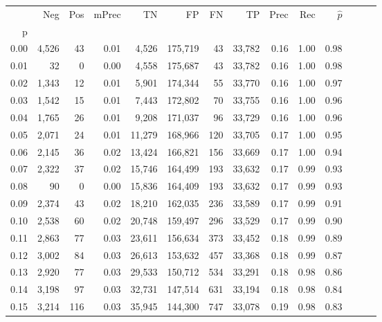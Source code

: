 \begin{tabular}{rrrrrrrrrrrrrr}
\toprule
{} &    Neg &    Pos & mPrec &       TN &       FP &      FN &      TP &  Prec &   Rec & $\hat{p}$ \\
p    &        &        &       &          &          &         &         &       &       &           \\
\midrule
0.00 &  4,526 &     43 &  0.01 &    4,526 &  175,719 &      43 &  33,782 &  0.16 &  1.00 &      0.98 \\
0.01 &     32 &      0 &  0.00 &    4,558 &  175,687 &      43 &  33,782 &  0.16 &  1.00 &      0.98 \\
0.02 &  1,343 &     12 &  0.01 &    5,901 &  174,344 &      55 &  33,770 &  0.16 &  1.00 &      0.97 \\
0.03 &  1,542 &     15 &  0.01 &    7,443 &  172,802 &      70 &  33,755 &  0.16 &  1.00 &      0.96 \\
0.04 &  1,765 &     26 &  0.01 &    9,208 &  171,037 &      96 &  33,729 &  0.16 &  1.00 &      0.96 \\
0.05 &  2,071 &     24 &  0.01 &   11,279 &  168,966 &     120 &  33,705 &  0.17 &  1.00 &      0.95 \\
0.06 &  2,145 &     36 &  0.02 &   13,424 &  166,821 &     156 &  33,669 &  0.17 &  1.00 &      0.94 \\
0.07 &  2,322 &     37 &  0.02 &   15,746 &  164,499 &     193 &  33,632 &  0.17 &  0.99 &      0.93 \\
0.08 &     90 &      0 &  0.00 &   15,836 &  164,409 &     193 &  33,632 &  0.17 &  0.99 &      0.93 \\
0.09 &  2,374 &     43 &  0.02 &   18,210 &  162,035 &     236 &  33,589 &  0.17 &  0.99 &      0.91 \\
0.10 &  2,538 &     60 &  0.02 &   20,748 &  159,497 &     296 &  33,529 &  0.17 &  0.99 &      0.90 \\
0.11 &  2,863 &     77 &  0.03 &   23,611 &  156,634 &     373 &  33,452 &  0.18 &  0.99 &      0.89 \\
0.12 &  3,002 &     84 &  0.03 &   26,613 &  153,632 &     457 &  33,368 &  0.18 &  0.99 &      0.87 \\
0.13 &  2,920 &     77 &  0.03 &   29,533 &  150,712 &     534 &  33,291 &  0.18 &  0.98 &      0.86 \\
0.14 &  3,198 &     97 &  0.03 &   32,731 &  147,514 &     631 &  33,194 &  0.18 &  0.98 &      0.84 \\
0.15 &  3,214 &    116 &  0.03 &   35,945 &  144,300 &     747 &  33,078 &  0.19 &  0.98 &      0.83 \\

\end{tabular}
